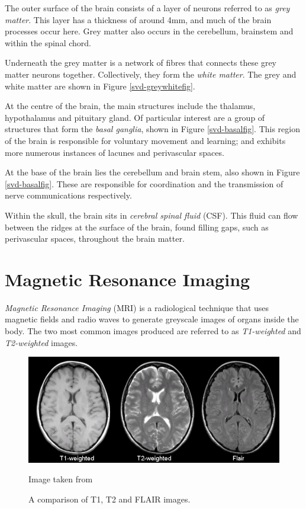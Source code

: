 The outer surface of the brain consists of a layer of neurons referred to as \textit{grey matter}. This layer has a thickness of around 4mm, and much of the brain processes occur here. Grey matter also occurs in the cerebellum, brainstem and within the spinal chord.

Underneath the grey matter is a network of fibres that connects these grey matter neurons together. Collectively, they form the \textit{white matter}. The grey and white matter are shown in Figure \ref{svd-greywhitefig}.

At the centre of the brain, the main structures include the thalamus, hypothalamus and pituitary gland. Of particular interest are a group of structures that form the \textit{basal ganglia}, shown in Figure \ref{svd-basalfig}. This region of the brain is responsible for voluntary movement and learning; and exhibits more numerous instances of lacunes and perivascular spaces.

At the base of the brain lies the cerebellum and brain stem, also shown in Figure \ref{svd-basalfig}. These are responsible for coordination and the transmission of nerve communications respectively.

Within the skull, the brain sits in \textit{cerebral spinal fluid} (CSF). This fluid can flow between the ridges  at the surface of the brain, found filling gaps, such as perivascular spaces, throughout the brain matter.


\section{Magnetic Resonance Imaging}\label{svd-MRI}

\textit{Magnetic Resonance Imaging }(MRI) is a radiological technique that uses magnetic fields and radio waves to generate greyscale images of organs inside the body. The two most common images produced are referred to as \textit{T1-weighted} and \textit{T2-weighted} images.

\begin{figure}[ht]
	\centering
	\includegraphics[width=\textwidth]{Images/2_t1_t2_flair.jpg}
	\caption{A comparison of T1, T2 and FLAIR images.}
	\small Image taken from \cite{Preston2006}
\end{figure}

